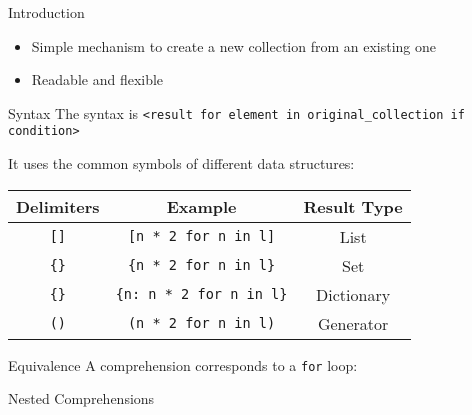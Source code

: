 \begin{frame}{Introduction}
  \begin{itemize}[<+->]
    \item Simple mechanism to create a new collection from an existing one
    \item Readable and flexible
  \end{itemize}
\end{frame}

\begin{frame}{Syntax}
  The syntax is \texttt{<result for element in original\_collection if condition>}

  It uses the common symbols of different data structures:

  \begin{center}
    \begin{tabular}{ccc}
      \textbf{Delimiters} & \textbf{Example} & \textbf{Result Type} \\
      \toprule
      \texttt{[]} & \texttt{[n * 2 for n in l]} & List \\
      \texttt{\{\}} & \texttt{\{n * 2 for n in l\}} & Set \\
      \texttt{\{\}} & \texttt{\{n: n * 2 for n in l\}} & Dictionary \\
      \texttt{()} & \texttt{(n * 2 for n in l)} & Generator \\
    \end{tabular}
  \end{center}
\end{frame}

\begin{frame}{Equivalence}
  A comprehension corresponds to a \texttt{for} loop:

\end{frame}

\begin{frame}{Nested Comprehensions}
\end{frame}
